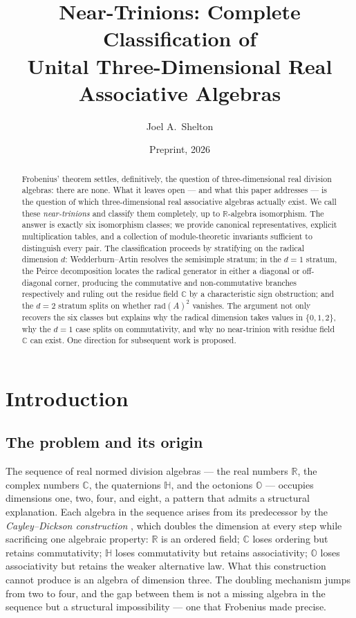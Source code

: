 \documentclass{amsart}
\title[Near-Trinions]{Near-Trinions: Complete Classification of\\
  Unital Three-Dimensional Real Associative Algebras}
\author{Joel A.\ Shelton}
\date{Preprint, 2026}
\theoremstyle{plain}
\theoremstyle{definition}
\theoremstyle{remark}
\newcommand{\RR}{\mathbb{R}}
\newcommand{\CC}{\mathbb{C}}
\newcommand{\HH}{\mathbb{H}}
\newcommand{\OO}{\mathbb{O}}
\newcommand{\Jac}{\mathrm{rad}}
\begin{document}
\begin{abstract}
Frobenius' theorem settles, definitively, the question of three-dimensional real division algebras: there are none. What it leaves open --- and what this paper addresses --- is the question of which three-dimensional real associative algebras actually exist. We call these \emph{near-trinions} and classify them completely, up to $\RR$-algebra isomorphism. The answer is exactly six isomorphism classes; we provide canonical representatives, explicit multiplication tables, and a collection of module-theoretic invariants sufficient to distinguish every pair. The classification proceeds by stratifying on the radical dimension $d$: Wedderburn--Artin resolves the semisimple stratum; in the $d=1$ stratum, the Peirce decomposition locates the radical generator in either a diagonal or off-diagonal corner, producing the commutative and non-commutative branches respectively and ruling out the residue field $\CC$ by a characteristic sign obstruction; and the $d=2$ stratum splits on whether $\Jac(A)^2$ vanishes. The argument not only recovers the six classes but explains why the radical dimension takes values in $\{0,1,2\}$, why the $d=1$ case splits on commutativity, and why no near-trinion with residue field $\CC$ can exist. One direction for subsequent work is proposed.
\end{abstract}

\maketitle

\section{Introduction}

\subsection{The problem and its origin}

The sequence of real normed division algebras --- the real numbers $\RR$,
the complex numbers $\CC$, the quaternions $\HH$, and the octonions $\OO$
--- occupies dimensions one, two, four, and eight, a pattern that admits
a structural explanation.
Each algebra in the sequence arises from its predecessor by the
\emph{Cayley--Dickson construction} \cite{Baez2002}, which doubles the dimension at every
step while sacrificing one algebraic property: $\RR$ is an ordered field;
$\CC$ loses ordering but retains commutativity; $\HH$ loses commutativity
but retains associativity; $\OO$ loses associativity but retains the
weaker alternative law.
What this construction cannot produce is an algebra of dimension three.
The doubling mechanism jumps from two to four, and the gap between them
is not a missing algebra in the sequence but a structural impossibility ---
one that Frobenius made precise.
\end{document}
